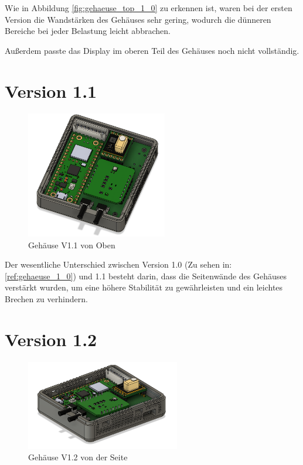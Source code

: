 \begin{inhalt}
Wie in Abbildung \ref{fig:gehaeuse_top_1_0} zu erkennen ist, waren bei der ersten Version die Wandstärken des Gehäuses sehr gering, wodurch die dünneren Bereiche bei jeder Belastung leicht abbrachen.



\vspace{0.15cm}

Außerdem passte das Display im oberen Teil des Gehäuses noch nicht vollständig.

\newpage

\section{Version 1.1}

\begin{figure}[!htb]
\centering
\includegraphics[width=0.55\textwidth]{files/Thomas/pics/geheause/1.1/gehaeuse_top.png}
\caption[Gehäuse V1.1 von Oben]{Gehäuse V1.1 von Oben}
\label{fig:gehaeuse_internet_bild}
\end{figure}

Der wesentliche Unterschied zwischen Version 1.0 (Zu sehen in: \ref{ref:gehaeuse_1_0}) und 1.1 besteht darin, dass die Seitenwände des Gehäuses verstärkt wurden, um eine höhere Stabilität zu gewährleisten und ein leichtes Brechen zu verhindern.

\newpage

\section{Version 1.2}

\begin{figure}[!htb]
\centering
\includegraphics[width=0.6\textwidth]{files/Thomas/pics/geheause/1.2/gehaeuse_side.png}
\caption[Gehäuse V1.2 von der Seit]{Gehäuse V1.2 von der Seite}
\label{fig:gehaeuse_internet_bild}
\end{figure}


\end{inhalt}
